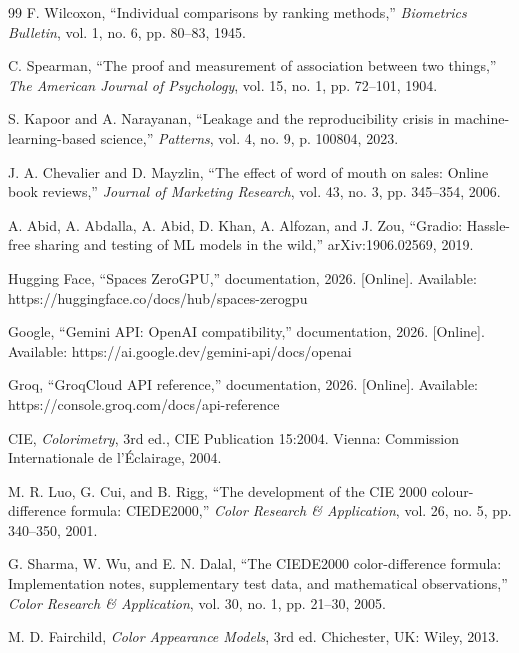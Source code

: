 \begin{thebibliography}{99}
 F. Wilcoxon, ``Individual comparisons by ranking methods,'' \textit{Biometrics Bulletin}, vol. 1, no. 6, pp. 80--83, 1945.

 C. Spearman, ``The proof and measurement of association between two things,'' \textit{The American Journal of Psychology}, vol. 15, no. 1, pp. 72--101, 1904.

 S. Kapoor and A. Narayanan, ``Leakage and the reproducibility crisis in machine-learning-based science,'' \textit{Patterns}, vol. 4, no. 9, p. 100804, 2023.

 J. A. Chevalier and D. Mayzlin, ``The effect of word of mouth on sales: Online book reviews,'' \textit{Journal of Marketing Research}, vol. 43, no. 3, pp. 345--354, 2006.

 A. Abid, A. Abdalla, A. Abid, D. Khan, A. Alfozan, and J. Zou, ``Gradio: Hassle-free sharing and testing of ML models in the wild,'' arXiv:1906.02569, 2019.

 Hugging Face, ``Spaces ZeroGPU,'' documentation, 2026. [Online]. Available: https://huggingface.co/docs/hub/spaces-zerogpu

 Google, ``Gemini API: OpenAI compatibility,'' documentation, 2026. [Online]. Available: https://ai.google.dev/gemini-api/docs/openai

 Groq, ``GroqCloud API reference,'' documentation, 2026. [Online]. Available: https://console.groq.com/docs/api-reference

 CIE, \textit{Colorimetry}, 3rd ed., CIE Publication 15:2004. Vienna: Commission Internationale de l'\'Eclairage, 2004.

 M. R. Luo, G. Cui, and B. Rigg, ``The development of the CIE 2000 colour-difference formula: CIEDE2000,'' \textit{Color Research \& Application}, vol. 26, no. 5, pp. 340--350, 2001.

 G. Sharma, W. Wu, and E. N. Dalal, ``The CIEDE2000 color-difference formula: Implementation notes, supplementary test data, and mathematical observations,'' \textit{Color Research \& Application}, vol. 30, no. 1, pp. 21--30, 2005.

 M. D. Fairchild, \textit{Color Appearance Models}, 3rd ed. Chichester, UK: Wiley, 2013.

\end{thebibliography}
